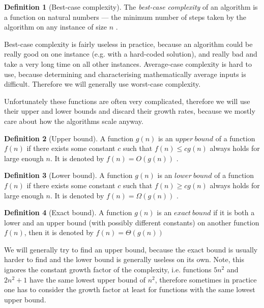 \documentclass{report}
\theoremstyle{plain}
\theoremstyle{definition}
\newtheorem{definition}{Definition}
\theoremstyle{remark}
\numberwithin{definition}{chapter}
\numberwithin{example}{chapter}
\numberwithin{figure}{chapter}
\numberwithin{theorem}{chapter}
\numberwithin{lemma}{chapter}
\begin{document}
\begin{definition}[Best-case complexity]
The \emph{best-case complexity} of an algorithm is a function on natural numbers --- the minimum number of steps taken by the algorithm on any instance of size $n$ \cite{skiena504algorithm}.
\end{definition}

Best-case complexity is fairly useless in practice, because an algorithm could be really good on one instance (e.g. with a hard-coded solution), and really bad and take a very long time on all other instances. Average-case complexity is hard to use, because determining and characterising mathematically average inputs is difficult. Therefore we will generally use worst-case complexity.

Unfortunately these functions are often very complicated, therefore we will use their upper and lower bounds and discard their growth rates, because we mostly care about how the algorithms scale anyway.

\begin{definition}[Upper bound]
A function $g(n)$ is an $upper \ bound$ of a function $f(n)$ if there exists some constant $c$ such that $f(n)\leq cg(n)$ always holds for large enough $n$. It is denoted by $f(n) = O(g(n))$ \cite{skiena504algorithm}.
\end{definition}

\begin{definition}[Lower bound]
A function $g(n)$ is an $lower \ bound$ of a function $f(n)$ if there exists some constant $c$ such that $f(n)\geq cg(n)$ always holds for large enough $n$. It is denoted by $f(n) = \Omega(g(n))$ \cite{skiena504algorithm}.
\end{definition}

\begin{definition}[Exact bound]
A function $g(n)$ is an $exact \ bound$ if it is both a lower and an upper bound (with possibly different constants) on another function $f(n)$, then it is denoted by $f(n) = \Theta(g(n))$
\end{definition}

We will generally try to find an upper bound, because the exact bound is usually harder to find and the lower bound is generally useless on its own. Note, this ignores the constant growth factor of the complexity, i.e. functions $5n^2$ and $2n^2+1$ have the same lowest upper bound of $n^2$, therefore sometimes in practice one has to consider the growth factor at least for functions with the same lowest upper bound.
\end{document}

